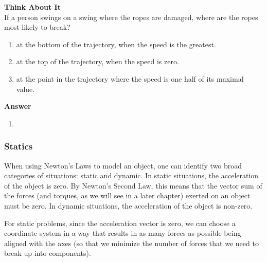 \begin{framed}
\textbf{Think About It}\\
If a person swings on a swing where the ropes are damaged, where are the ropes most likely to break?

\begin{enumerate}
\item at the bottom of the trajectory, when the speed is the greatest.
\item at the top of the trajectory, when the speed is zero.
\item at the point in the trajectory where the speed is one half of its maximal value.
\end{enumerate}

\begin{framed}
\textbf{Answer}\\
\begin{enumerate}
\item
\end{enumerate}
\end{framed}
\end{framed}

\subsubsection{Statics}

When using Newton's Laws to model an object, one can identify two broad categories of situations: static and dynamic. In static situations, the acceleration of the object is zero. By Newton's Second Law, this means that the vector sum of the forces (and torques, as we will see in a later chapter) exerted on an object must be zero. In dynamic situations, the acceleration of the object is non-zero.

For static problems, since the acceleration vector is zero, we can choose a coordinate system in a way that results in as many forces as possible being aligned with the axes (so that we minimize the number of forces that we need to break up into components).

